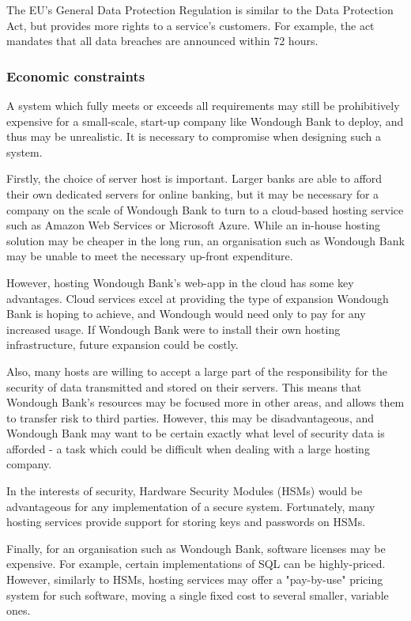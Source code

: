 The EU's General Data Protection Regulation is similar to the Data Protection Act, but provides more rights to a service's customers. For example, the act mandates that all data breaches are announced within 72 hours.

\subsubsection{Economic constraints}

A system which fully meets or exceeds all requirements may still be prohibitively expensive for a small-scale, start-up company like Wondough Bank to deploy, and thus may be unrealistic. It is necessary to compromise when designing such a system. 

Firstly, the choice of server host is important. Larger banks are able to afford their own dedicated servers for online banking, but it may be necessary for a company on the scale of Wondough Bank to turn to a cloud-based hosting service such as Amazon Web Services or Microsoft Azure. While an in-house hosting solution may be cheaper in the long run, an organisation such as Wondough Bank may be unable to meet the necessary up-front expenditure.

However, hosting Wondough Bank's web-app in the cloud has some key advantages. Cloud services excel at providing the type of expansion Wondough Bank is hoping to achieve, and Wondough would need only to pay for any increased usage. If Wondough Bank were to install their own hosting infrastructure, future expansion could be costly.

Also, many hosts are willing to accept a large part of the responsibility for the security of data transmitted and stored on their servers. This means that Wondough Bank's resources may be focused more in other areas, and allows them to transfer risk to third parties. However, this may be disadvantageous, and Wondough Bank may want to be certain exactly what level of security data is afforded - a task which could be difficult when dealing with a large hosting company.

In the interests of security, Hardware Security Modules (HSMs) would be advantageous for any implementation of a secure system. Fortunately, many hosting services provide support for storing keys and passwords on HSMs.

Finally, for an organisation such as Wondough Bank, software licenses may be expensive. For example, certain implementations of SQL can be highly-priced. However, similarly to HSMs, hosting services may offer a "pay-by-use" pricing system for such software, moving a single fixed cost to several smaller, variable ones.

